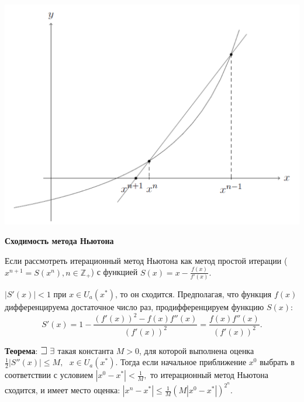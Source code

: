 \includegraphics[scale=0.4]{pics/osn_30_1.png}

\centerline{\textbf{Сходимость метода Ньютона}}

Если рассмотреть итерационный метод Ньютона как метод простой итерации ($x^{n+1}=S(x^n), n\in \mathbb{Z_+}$) 
с функцией $S(x) = x - \frac{f(x)}{f'(x)}.$

$|S'(x)| < 1$ при $x \in U_a(x^*)$, то он сходится.
Предполагая, что функция $f(x)$ дифференцируема достаточное число раз,
продифференцируем функцию $S(x)$:
%
$$
    S'(x) = 1 - \frac{(f'(x))^2 - f(x)f''(x)}{(f'(x))^2} =
    \frac{f(x)f''(x)}{(f'(x))^2}.
$$%

\textbf{Теорема}: $\mathLet ~ \exists$ такая константа $M > 0$, для которой выполнена оценка
$\frac{1}{2}\left|S''(x)\right| \leqslant M, ~~~x \in U_a(x^*).$ 
Тогда если начальное приближение $x^0$ выбрать в соответствии с условием
$ |x^0 - x^*| < \frac{1}{M},$
то итерационный метод Ньютона сходится, и имеет место оценка:
$ |x^n - x^*| \leqslant \frac{1}{M}\left(M|x^0 - x^*|\right)^{2^n}.$

